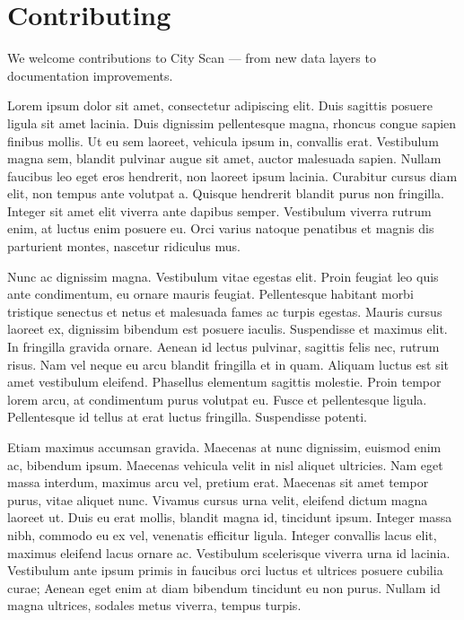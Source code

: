 \documentclass[
  letterpaper,
  DIV=11,
  numbers=noendperiod]{scrreprt}
\begin{document}
\chapter{Contributing}\label{contributing}

We welcome contributions to City Scan --- from new data layers to
documentation improvements.

Lorem ipsum dolor sit amet, consectetur adipiscing elit. Duis sagittis
posuere ligula sit amet lacinia. Duis dignissim pellentesque magna,
rhoncus congue sapien finibus mollis. Ut eu sem laoreet, vehicula ipsum
in, convallis erat. Vestibulum magna sem, blandit pulvinar augue sit
amet, auctor malesuada sapien. Nullam faucibus leo eget eros hendrerit,
non laoreet ipsum lacinia. Curabitur cursus diam elit, non tempus ante
volutpat a. Quisque hendrerit blandit purus non fringilla. Integer sit
amet elit viverra ante dapibus semper. Vestibulum viverra rutrum enim,
at luctus enim posuere eu. Orci varius natoque penatibus et magnis dis
parturient montes, nascetur ridiculus mus.

Nunc ac dignissim magna. Vestibulum vitae egestas elit. Proin feugiat
leo quis ante condimentum, eu ornare mauris feugiat. Pellentesque
habitant morbi tristique senectus et netus et malesuada fames ac turpis
egestas. Mauris cursus laoreet ex, dignissim bibendum est posuere
iaculis. Suspendisse et maximus elit. In fringilla gravida ornare.
Aenean id lectus pulvinar, sagittis felis nec, rutrum risus. Nam vel
neque eu arcu blandit fringilla et in quam. Aliquam luctus est sit amet
vestibulum eleifend. Phasellus elementum sagittis molestie. Proin tempor
lorem arcu, at condimentum purus volutpat eu. Fusce et pellentesque
ligula. Pellentesque id tellus at erat luctus fringilla. Suspendisse
potenti.

Etiam maximus accumsan gravida. Maecenas at nunc dignissim, euismod enim
ac, bibendum ipsum. Maecenas vehicula velit in nisl aliquet ultricies.
Nam eget massa interdum, maximus arcu vel, pretium erat. Maecenas sit
amet tempor purus, vitae aliquet nunc. Vivamus cursus urna velit,
eleifend dictum magna laoreet ut. Duis eu erat mollis, blandit magna id,
tincidunt ipsum. Integer massa nibh, commodo eu ex vel, venenatis
efficitur ligula. Integer convallis lacus elit, maximus eleifend lacus
ornare ac. Vestibulum scelerisque viverra urna id lacinia. Vestibulum
ante ipsum primis in faucibus orci luctus et ultrices posuere cubilia
curae; Aenean eget enim at diam bibendum tincidunt eu non purus. Nullam
id magna ultrices, sodales metus viverra, tempus turpis.
\end{document}
